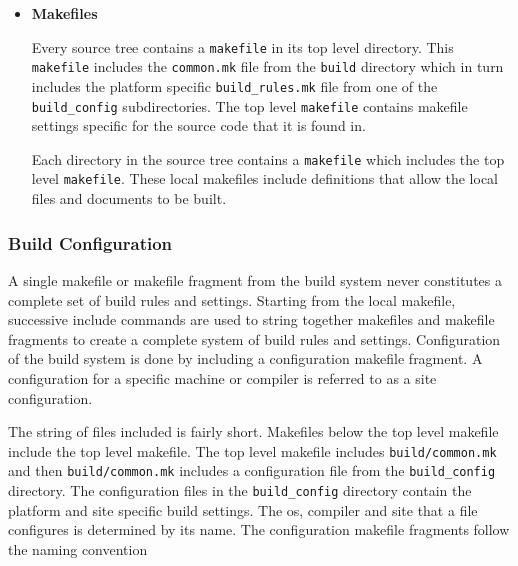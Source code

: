 \begin{itemize}


\item{{\bf Makefiles}}

Every source tree contains a {\tt makefile} in its top level directory. This
{\tt makefile} includes the {\tt common.mk} file from the {\tt build} directory
which in turn includes the platform specific {\tt build\_rules.mk} file from
one of the {\tt build\_config} subdirectories. The top level {\tt makefile}
contains makefile settings specific for the source code that it is found in.

Each directory in the source tree contains a {\tt makefile} which includes
the top level {\tt makefile}. These local makefiles include definitions that
allow the local files and documents to be built.
\end{itemize}

\subsubsection{Build Configuration}

A single makefile or makefile fragment from the build system never
constitutes a complete set of build rules and settings.  Starting from
the local makefile, successive include commands are used to string
together makefiles and makefile fragments to create a complete system
of build rules and settings.  Configuration of the build system is
done by including a configuration makefile fragment. A configuration for a
specific machine or compiler is referred to as a site configuration.

The string of files included is fairly short.  Makefiles below the top
level makefile include the top level makefile. The top level makefile
includes {\tt build/common.mk} and then {\tt build/common.mk} includes a
configuration file from the {\tt build\_config} directory.  The configuration
files in the {\tt build\_config} directory contain the platform and site
specific build settings.  The os, compiler and site that a file
configures is determined by its name.  The configuration makefile
fragments follow the naming convention

